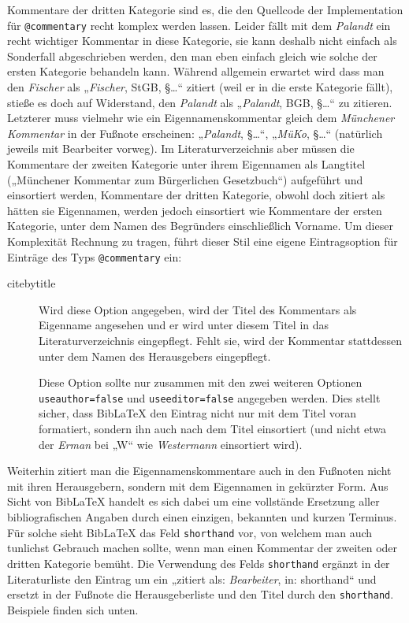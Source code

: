 \documentclass[11pt,a4paper,DIV=calc,draft]{scrartcl}
\newcommand\software[1]{\textsf{#1}}
\newcommand\Biblatex{\software{Bib\LaTeX{}}\xspace}
\newcommand\name[1]{\textit{#1}}
\begin{document}
Kommentare der dritten Kategorie sind es, die den Quellcode der
Implementation für \verb+@commentary+ recht komplex werden
lassen. Leider fällt mit dem \name{Palandt} ein recht wichtiger
Kommentar in diese Kategorie, sie kann deshalb nicht einfach als
Sonderfall abgeschrieben werden, den man eben einfach gleich wie
solche der ersten Kategorie behandeln kann. Während allgemein erwartet
wird dass man den \name{Fischer} als „\name{Fischer}, StGB, §…“
zitiert (weil er in die erste Kategorie fällt), stieße es doch auf
Widerstand, den \name{Palandt} als „\name{Palandt}, BGB, §…“ zu
zitieren. Letzterer muss vielmehr wie ein Eigennamenskommentar gleich
dem \name{Münchener Kommentar} in der Fußnote erscheinen:
„\name{Palandt}, §…“, „\name{MüKo}, §…“ (natürlich jeweils mit
Bearbeiter vorweg). Im Literaturverzeichnis aber müssen die Kommentare
der zweiten Kategorie unter ihrem Eigennamen als Langtitel („Münchener
Kommentar zum Bürgerlichen Gesetzbuch“) aufgeführt und einsortiert
werden, Kommentare der dritten Kategorie, obwohl doch zitiert als
hätten sie Eigennamen, werden jedoch einsortiert wie Kommentare der
ersten Kategorie, \dh unter dem Namen des Begründers einschließlich
Vorname. Um dieser Komplexität Rechnung zu tragen, führt dieser Stil
eine eigene Eintragsoption für Einträge des Typs \verb+@commentary+
ein:

\begin{description}
\item[citebytitle] Wird diese Option angegeben, wird der Titel des
  Kommentars als Eigenname angesehen und er wird unter diesem Titel in
  das Literaturverzeichnis eingepflegt. Fehlt sie, wird der Kommentar
  stattdessen unter dem Namen des Herausgebers eingepflegt.

  Diese Option sollte nur zusammen mit den zwei weiteren Optionen
  \verb+useauthor=false+ und \verb+useeditor=false+ angegeben
  werden. Dies stellt sicher, dass \Biblatex den Eintrag nicht nur mit
  dem Titel voran formatiert, sondern ihn auch nach dem Titel
  einsortiert (und nicht etwa der \name{Erman} bei „W“ wie
  \name{Westermann} einsortiert wird).
\end{description}

Weiterhin zitiert man die Eigennamenskommentare auch in den Fußnoten nicht
mit ihren Herausgebern, sondern mit dem Eigennamen in gekürzter
Form. Aus Sicht von \Biblatex handelt es sich dabei um eine vollstände
Ersetzung aller bibliografischen Angaben durch einen einzigen,
bekannten und kurzen Terminus. Für solche sieht \Biblatex das Feld
\verb+shorthand+ vor, von welchem man auch tunlichst Gebrauch machen
sollte, wenn man einen Kommentar der zweiten oder dritten Kategorie
bemüht. Die Verwendung des Felds \verb+shorthand+ ergänzt in der
Literaturliste den Eintrag um ein „zitiert als: \name{Bearbeiter}, in:
shorthand“ und ersetzt in der Fußnote die Herausgeberliste und den
Titel durch den \verb+shorthand+. Beispiele finden sich unten.
\end{document}
